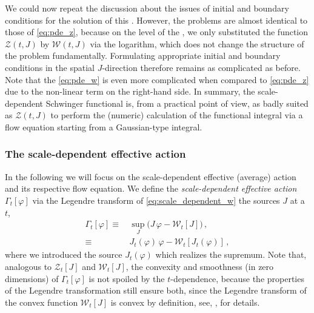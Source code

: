 We could now repeat the discussion about the issues of initial and boundary conditions for the solution of this \pde{}.
However, the problems are almost identical to those of \cref{eq:pde_z}, because on the level of the \pde{}, we only substituted the function $\mathcal{Z} ( t, J )$ by $\mathcal{W} ( t, J )$ via the logarithm, which does not change the structure of the problem fundamentally.
Formulating appropriate initial and boundary conditions in the spatial $J$-direction therefore remains as complicated as before.
Note that the \pde{} \eqref{eq:pde_w} is even more complicated when compared to \cref{eq:pde_z} due to the non-linear term on the right-hand side.
In summary, the scale-dependent Schwinger functional is, from a practical point of view, as badly suited as $\mathcal{Z}(t,J)$ to perform the (numeric) calculation of the functional integral via a flow equation starting from a Gaussian-type integral.

\subsubsection{The scale-dependent effective action}\label{subsubsec:scale_dependent_effective_action}
In the following we will focus on the scale-dependent effective (average) action and its respective flow equation.
We define the \textit{scale-dependent effective action} $\Gamma_t[\varphi]$ via the Legendre transform of \cref{eq:scale_dependent_w} \wrt{} the sources $J$ at a \rgtime{} $t$,
\begin{subequations}
\begin{align}
	\Gamma_t [\varphi] \equiv \, & \mathop{\mathrm{sup}}_J \big( J \, \varphi - \mathcal{W}_t[J] \big)\, ,\label{eq:scale_dependent_effective_action}\\
	\equiv  \, & J_t(\varphi) \, \varphi - \mathcal{W}_t[J_t(\varphi)] \, ,	\label{eq:scale_dependent_effective_action_Jt}
\end{align}
\end{subequations}
where we introduced the source $J_t(\varphi)$ which realizes the supremum.
Note that, analogous to $\mathcal{Z}_t [J]$ and $\mathcal{W}_t [J]$, the convexity and smoothness (in zero dimensions) of $\Gamma_t [\varphi]$ is not spoiled by the $t$-dependence, because the properties of the Legendre transformation still ensure both, since the Legendre transform of the convex function $\mathcal{W}_t[J]$ is convex by definition, see, \eg{},  for details.
	
